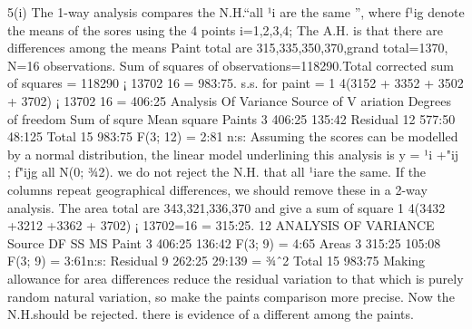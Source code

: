 5(i) The 1-way analysis compares the N.H.“all ¹i are the same ”, where f¹ig denote
the means of the sores using the 4 points i=1,2,3,4; The A.H. is that there are differences
among the means
Paint total are 315,335,350,370,grand total=1370, N=16 observations. Sum of squares
of observations=118290.Total corrected sum of squares = 118290 ¡ 13702
16 = 983:75. s.s.
for paint = 1
4(3152 + 3352 + 3502 + 3702) ¡ 13702
16 = 406:25
Analysis Of Variance
Source of V ariation Degrees of freedom Sum of squre Mean square
Paints 3 406:25 135:42
Residual 12 577:50 48:125
Total 15 983:75
F(3; 12) = 2:81 n:s:
Assuming the scores can be modelled by a normal distribution, the linear model underlining
this analysis is y = ¹i +"ij ; f"ijg all N(0; ¾2). we do not reject the N.H. that all
¹iare the same.
If the columns repeat geographical differences, we should remove these in a 2-way analysis.
The area total are 343,321,336,370 and give a sum of square 1
4(3432 +3212 +3362 +
3702) ¡ 13702=16 = 315:25.
12
ANALYSIS OF VARIANCE
Source DF SS MS
Paint 3 406:25 136:42 F(3; 9) = 4:65
Areas 3 315:25 105:08 F(3; 9) = 3:61n:s:
Residual 9 262:25 29:139 = ¾ˆ2
Total 15 983:75
Making allowance for area differences reduce the residual variation to that which is
purely random natural variation, so make the paints comparison more precise. Now the
N.H.should be rejected. there is evidence of a different among the paints.
